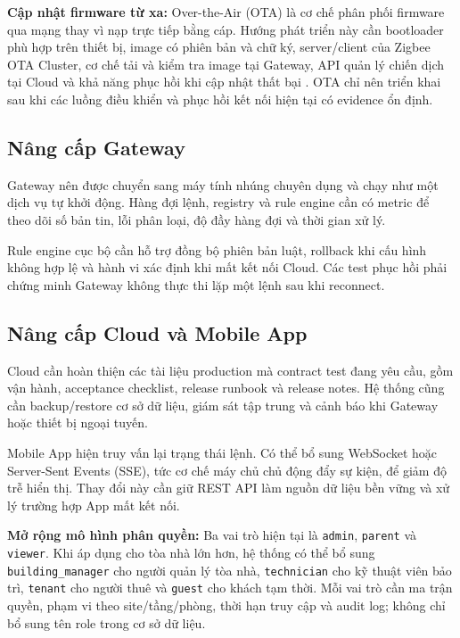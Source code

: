 \textbf{Cập nhật firmware từ xa:} Over-the-Air (OTA) là cơ chế phân phối firmware qua mạng thay vì nạp trực tiếp bằng cáp. Hướng phát triển này cần bootloader phù hợp trên thiết bị, image có phiên bản và chữ ký, server/client của Zigbee OTA Cluster, cơ chế tải và kiểm tra image tại Gateway, API quản lý chiến dịch tại Cloud và khả năng phục hồi khi cập nhật thất bại \cite{silabs-ota}. OTA chỉ nên triển khai sau khi các luồng điều khiển và phục hồi kết nối hiện tại có evidence ổn định.

\subsection{Nâng cấp Gateway}
\label{sec:ch6-gw-future}

Gateway nên được chuyển sang máy tính nhúng chuyên dụng và chạy như một dịch vụ tự khởi động. Hàng đợi lệnh, registry và rule engine cần có metric để theo dõi số bản tin, lỗi phân loại, độ đầy hàng đợi và thời gian xử lý.

Rule engine cục bộ cần hỗ trợ đồng bộ phiên bản luật, rollback khi cấu hình không hợp lệ và hành vi xác định khi mất kết nối Cloud. Các test phục hồi phải chứng minh Gateway không thực thi lặp một lệnh sau khi reconnect.

\subsection{Nâng cấp Cloud và Mobile App}
\label{sec:ch6-cloud-future}

Cloud cần hoàn thiện các tài liệu production mà contract test đang yêu cầu, gồm vận hành, acceptance checklist, release runbook và release notes. Hệ thống cũng cần backup/restore cơ sở dữ liệu, giám sát tập trung và cảnh báo khi Gateway hoặc thiết bị ngoại tuyến.

Mobile App hiện truy vấn lại trạng thái lệnh. Có thể bổ sung WebSocket hoặc Server-Sent Events (SSE), tức cơ chế máy chủ chủ động đẩy sự kiện, để giảm độ trễ hiển thị. Thay đổi này cần giữ REST API làm nguồn dữ liệu bền vững và xử lý trường hợp App mất kết nối.

\textbf{Mở rộng mô hình phân quyền:} Ba vai trò hiện tại là \texttt{admin}, \texttt{parent} và \texttt{viewer}. Khi áp dụng cho tòa nhà lớn hơn, hệ thống có thể bổ sung \texttt{building\_manager} cho người quản lý tòa nhà, \texttt{technician} cho kỹ thuật viên bảo trì, \texttt{tenant} cho người thuê và \texttt{guest} cho khách tạm thời. Mỗi vai trò cần ma trận quyền, phạm vi theo site/tầng/phòng, thời hạn truy cập và audit log; không chỉ bổ sung tên role trong cơ sở dữ liệu.

